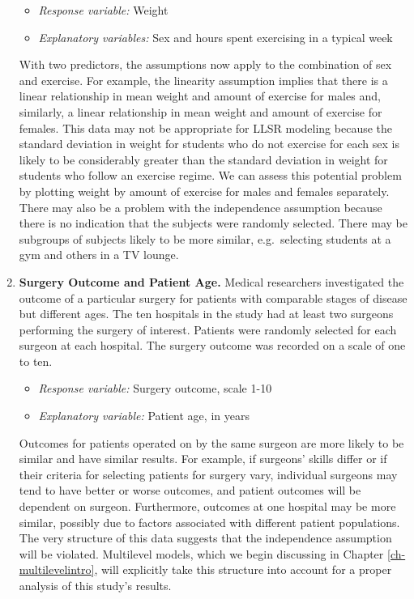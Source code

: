 \documentclass[
]{krantz}
\providecommand{\tightlist}{%
  \setlength{\itemsep}{0pt}\setlength{\parskip}{0pt}}
\begin{document}
\begin{enumerate}
  \begin{itemize}
  \tightlist
  \item
    \emph{Response variable:} Weight
  \item
    \emph{Explanatory variables:} Sex and hours spent exercising in a typical week
  \end{itemize}

  With two predictors, the assumptions now apply to the combination of sex and exercise. For example, the linearity assumption implies that there is a linear relationship in mean weight and amount of exercise for males and, similarly, a linear relationship in mean weight and amount of exercise for females. This data may not be appropriate for LLSR modeling because the standard deviation in weight for students who do not exercise for each sex is likely to be considerably greater than the standard deviation in weight for students who follow an exercise regime. We can assess this potential problem by plotting weight by amount of exercise for males and females separately. There may also be a problem with the independence assumption because there is no indication that the subjects were randomly selected. There may be subgroups of subjects likely to be more similar, e.g.~selecting students at a gym and others in a TV lounge.
\item
  \textbf{Surgery Outcome and Patient Age.} Medical researchers investigated the outcome of a particular surgery for patients with comparable stages of disease but different ages. The ten hospitals in the study had at least two surgeons performing the surgery of interest. Patients were randomly selected for each surgeon at each hospital. The surgery outcome was recorded on a scale of one to ten.

  \begin{itemize}
  \tightlist
  \item
    \emph{Response variable:} Surgery outcome, scale 1-10
  \item
    \emph{Explanatory variable:} Patient age, in years
  \end{itemize}

  Outcomes for patients operated on by the same surgeon are more likely to be similar and have similar results. For example, if surgeons' skills differ or if their criteria for selecting patients for surgery vary, individual surgeons may tend to have better or worse outcomes, and patient outcomes will be dependent on surgeon. Furthermore, outcomes at one hospital may be more similar, possibly due to factors associated with different patient populations. The very structure of this data suggests that the independence assumption will be violated. Multilevel models, which we begin discussing in Chapter \ref{ch-multilevelintro}, will explicitly take this structure into account for a proper analysis of this study's results.
\end{enumerate}
\end{document}

